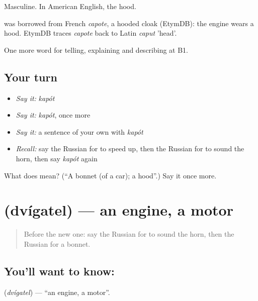Masculine. In American English, the hood.

\begin{cousinweb}
\emph{} was borrowed from French \emph{capote}, a hooded cloak (EtymDB): the engine wears a hood. EtymDB traces \emph{capote} back to Latin \emph{caput} 'head'.
\end{cousinweb}

\begin{grammarlens}[title={What you've built}]
One more word for telling, explaining and describing at B1.
\end{grammarlens}

\subsection*{Your turn}
\begin{itemize}
\raggedright
  \item \emph{Say it:} \emph{kapót}
  \item \emph{Say it:} \emph{kapót}, once more
  \item \emph{Say it:} a sentence of your own with \emph{kapót}
  \item \emph{Recall:} say the Russian for to speed up, then the Russian for to sound the horn, then say \emph{kapót} again
\end{itemize}

\begin{tcolorbox}[breakable,colback=teal!4,colframe=teal!35!black,title={Before you move on}]
What does  mean? (\textquotedblleft{}A bonnet (of a car); a hood\textquotedblright{}.) Say it once more.
\end{tcolorbox}
\section[\texorpdfstring{\ru{двигатель} (dvígatel)}{двигатель (dvígatel)}]{ (dvígatel) — an engine, a motor}

\label{lesson:RU-C404-dvigatel}



\begin{quote}
Before the new one: say the Russian for to sound the horn, then the Russian for a bonnet.
\end{quote}

\subsection*{You'll want to know: }
\textbf{} (\emph{dvígatel}) — \textquotedblleft{}an engine, a motor\textquotedblright{}.

